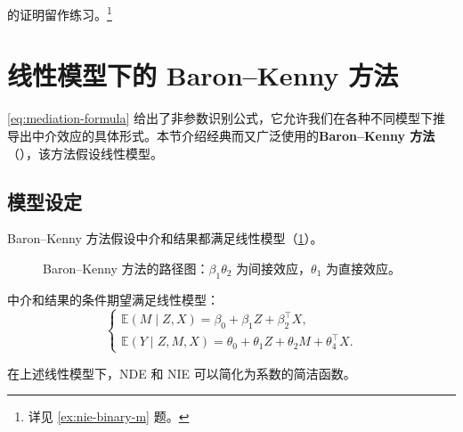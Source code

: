 \fboxsep=5pt\fboxrule=1pt
\noindent{}

 的证明留作练习。\footnote{详见 \cref{ex:nie-binary-m} 题。}

\section{线性模型下的 Baron--Kenny 方法}

\cref{eq:mediation-formula} 给出了非参数识别公式，它允许我们在各种不同模型下推导出中介效应的具体形式。本节介绍经典而又广泛使用的\textbf{Baron--Kenny 方法}（\citeyear{baron1986moderator}），该方法假设线性模型。

\subsection{模型设定}

Baron--Kenny 方法假设中介和结果都满足线性模型（\cref{fg:mediation-dag-bk}）。

\begin{figure}[ht]
\centering
\begin{xy}
\end{xy}
\caption{Baron--Kenny 方法的路径图：$\beta_1 \theta_2$ 为间接效应，$\theta_1$ 为直接效应。}
\label{fg:mediation-dag-bk}
\end{figure}

\begin{assumption}\label{assume:bk-model}
中介和结果的条件期望满足线性模型：
\[
\begin{cases}
\mathbb{E}(M \mid Z, X) = \beta_0 + \beta_1 Z + \beta_2^\top X, \\[4pt]
\mathbb{E}(Y \mid Z, M, X) = \theta_0 + \theta_1 Z + \theta_2 M + \theta_4^\top X.
\end{cases}
\tag{27.1}
\]
\end{assumption}

在上述线性模型下，NDE 和 NIE 可以简化为系数的简洁函数。

